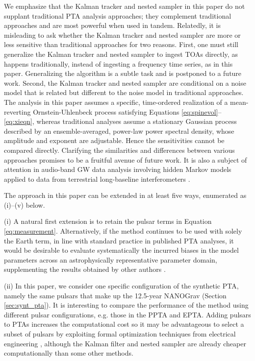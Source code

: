 \documentclass[fleqn,usenatbib,useAMS]{mnras}
\begin{document}
 
We emphasize that the Kalman tracker and nested sampler in this paper do not supplant traditional PTA analysis approaches; they complement traditional approaches and are most powerful when used in tandem. Relatedly, it is misleading to ask whether the Kalman tracker and nested sampler are more or less sensitive than traditional approaches for two reasons. First, one must still generalize the Kalman tracker and nested sampler to ingest TOAs directly, as happens traditionally, instead of ingesting a frequency time series, as in this paper. Generalizing the algorithm is a subtle task and is postponed to a future work. Second, the Kalman tracker and nested sampler are conditional on a noise model that is related but different to the noise model in traditional approaches. The analysis in this paper assumes a specific, time-ordered realization of a mean-reverting Ornstein-Uhlenbeck process satisfying Equations \eqref{eq:spinevol}--\eqref{eq:xieqn}, whereas traditional analyses assume a stationary Gaussian process described by an ensemble-averaged, power-law power spectral density, whose amplitude and exponent are adjustable. Hence the sensitivities cannot be compared directly. Clarifying the similarities and differences between various approaches promises to be a fruitful avenue of future work. It is also a subject of attention in audio-band GW data analysis involving hidden Markov models applied to data from terrestrial long-baseline interferometers \citep{PhysRevD.102.023006,PhysRevD.105.022002,Abbott_2022SCO,2022PhRvD.106f2002A}. \newline 



 The approach in this paper can be extended in at least five ways, enumerated as (i)--(v) below. \newline 
 
(i) A natural first extension is to retain the pulsar terms in Equation \eqref{eq:measurement}. Alternatively, if the method continues to be used with solely the Earth term, in line with standard practice in published PTA analyses, it would be desirable to evaluate systematically the incurred biases in the model parameters across an astrophysically representative parameter domain, supplementing the results obtained by other authors \citep{Zhupulsarterms,Chen2022}.\newline 


(ii) In this paper, we consider one specific configuration of the synthetic PTA, namely the same pulsars that make up the 12.5-year NANOGrav (Section \ref{sec:synt_pta}). It is interesting to compare the performance of the method using different pulsar configurations, e.g. those in the PPTA and EPTA. Adding pulsars to PTAs increases the computational cost so it may be advantageous to select a subset of pulsars by exploiting formal optimization techniques from electrical engineering \citep{2023MNRAS.518.1802S}, although the Kalman filter and nested sampler are already cheaper computationally than some other methods. \newline 
\end{document}
